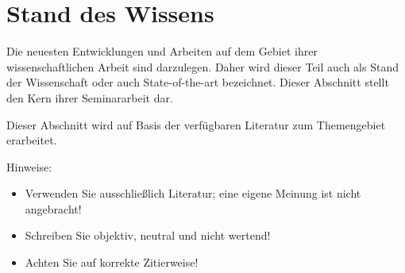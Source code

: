 \chapter{Stand des Wissens} \label{cha:stateOfKnowledge}

Die neuesten Entwicklungen und Arbeiten auf dem Gebiet ihrer wissenschaftlichen Arbeit sind darzulegen. Daher wird dieser Teil auch als Stand der Wissenschaft oder auch State-of-the-art bezeichnet. Dieser Abschnitt stellt den Kern ihrer Seminararbeit dar.

Dieser Abschnitt wird auf Basis der verfügbaren Literatur zum Themengebiet erarbeitet.

Hinweise:
\begin{itemize}
    \item Verwenden Sie ausschließlich Literatur; eine eigene Meinung ist nicht angebracht!
    \item Schreiben Sie objektiv, neutral und nicht wertend!
    \item Achten Sie auf korrekte Zitierweise!
\end{itemize}
\clearpage
